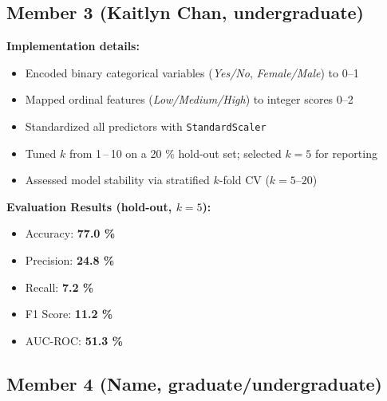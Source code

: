 \documentclass[11pt,a4paper]{article}
\begin{document}
\subsection{Member 3 (Kaitlyn Chan, undergraduate)}
\begin{tcolorbox}[%
        title=K-Nearest Neighbors Classification,
        colback=lightgreen!30,
        colframe=darkgreen,
        boxrule=0.5pt,
        fonttitle=\bfseries\sffamily\footnotesize,
        fontupper=\footnotesize
    ]
    \textbf{Implementation details:}
    \begin{itemize}[leftmargin=*, itemsep=2pt, parsep=0pt]
        \item Encoded binary categorical variables (\textit{Yes/No}, \textit{Female/Male}) to  \numrange{0}{1}
        \item Mapped ordinal features (\textit{Low/Medium/High}) to integer scores \numrange{0}{2}
        \item Standardized all predictors with \texttt{StandardScaler}
        \item Tuned $k$ from 1\,–\,10 on a 20 \% hold-out set; selected $k\!=\!5$ for reporting
        \item Assessed model stability via stratified $k$-fold CV ($k\!=\!5\text{–}20$)
    \end{itemize}

    \textbf{Evaluation Results (hold-out, $k=5$):}
    \begin{itemize}[leftmargin=*, itemsep=2pt, parsep=0pt]
        \item Accuracy: \textbf{77.0 \%}
        \item Precision: \textbf{24.8 \%}
        \item Recall: \textbf{7.2 \%}
        \item F1 Score: \textbf{11.2 \%}
        \item AUC-ROC: \textbf{51.3 \%}
    \end{itemize}
\end{tcolorbox}


\subsection{Member 4 (Name, graduate/undergraduate)}
\end{document}
